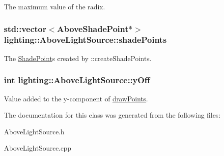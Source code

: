 The maximum value of the radix. 

\subsubsection[{\texorpdfstring{shade\+Points}{shadePoints}}]{\setlength{\rightskip}{0pt plus 5cm}std\+::vector$<${\bf Above\+Shade\+Point}$\ast$$>$ lighting\+::\+Above\+Light\+Source\+::shade\+Points\hspace{0.3cm}{\ttfamily [protected]}}\hypertarget{classlighting_1_1AboveLightSource_a255e98bb6aae0099178cb7aa2d9671a5}{}\label{classlighting_1_1AboveLightSource_a255e98bb6aae0099178cb7aa2d9671a5}


The \hyperlink{classlighting_1_1ShadePoint}{Shade\+Point}s created by \+::create\+Shade\+Points. 

\subsubsection[{\texorpdfstring{y\+Off}{yOff}}]{\setlength{\rightskip}{0pt plus 5cm}int lighting\+::\+Above\+Light\+Source\+::y\+Off\hspace{0.3cm}{\ttfamily [protected]}}\hypertarget{classlighting_1_1AboveLightSource_a558b3b3a03cdabc36a6ae73cbd41083d}{}\label{classlighting_1_1AboveLightSource_a558b3b3a03cdabc36a6ae73cbd41083d}


Value added to the y-\/component of \hyperlink{classlighting_1_1AboveLightSource_a225b94f0f210561668b94e412c66443b}{draw\+Points}. 



The documentation for this class was generated from the following files\+:\begin{DoxyCompactItemize}
\item 
Above\+Light\+Source.\+h\item 
Above\+Light\+Source.\+cpp\end{DoxyCompactItemize}
